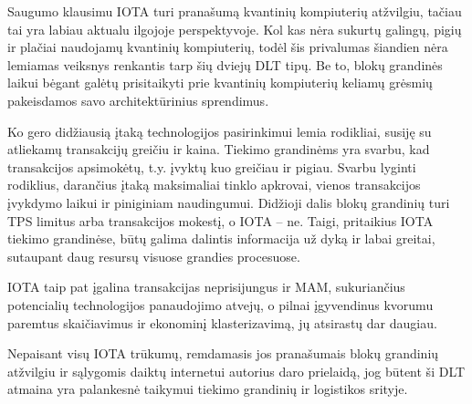Saugumo klausimu IOTA turi pranašumą kvantinių kompiuterių atžvilgiu, tačiau tai yra labiau aktualu ilgojoje perspektyvoje. Kol kas nėra sukurtų galingų, pigių ir plačiai naudojamų kvantinių kompiuterių, todėl šis privalumas šiandien nėra lemiamas veiksnys renkantis tarp šių dviejų DLT tipų. Be to, blokų grandinės laikui bėgant galėtų prisitaikyti prie kvantinių kompiuterių keliamų grėsmių pakeisdamos savo architektūrinius sprendimus.

Ko gero didžiausią įtaką technologijos pasirinkimui lemia rodikliai, susiję su atliekamų transakcijų greičiu ir kaina. Tiekimo grandinėms yra svarbu, kad transakcijos apsimokėtų, t.y. įvyktų kuo greičiau ir pigiau. Svarbu lyginti rodiklius, darančius įtaką maksimaliai tinklo apkrovai, vienos transakcijos įvykdymo laikui ir piniginiam naudingumui. Didžioji dalis blokų grandinių turi TPS limitus arba transakcijos mokestį, o IOTA – ne. Taigi, pritaikius IOTA tiekimo grandinėse, būtų galima dalintis informacija už dyką ir labai greitai, sutaupant daug resursų visuose grandies procesuose.

IOTA taip pat įgalina transakcijas neprisijungus ir MAM, sukuriančius potencialių technologijos panaudojimo atvejų, o pilnai įgyvendinus kvorumu paremtus skaičiavimus ir ekonominį klasterizavimą, jų atsirastų dar daugiau.

Nepaisant visų IOTA trūkumų, remdamasis jos pranašumais blokų grandinių atžvilgiu ir sąlygomis daiktų internetui autorius daro prielaidą, jog būtent ši DLT atmaina yra palankesnė taikymui tiekimo grandinių ir logistikos srityje. 